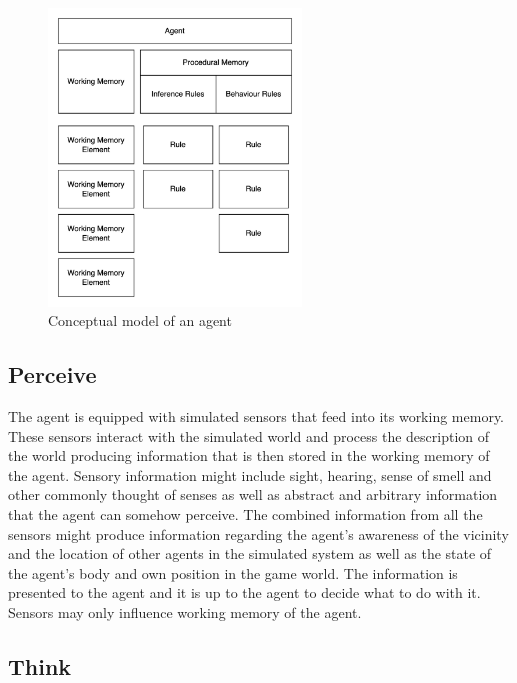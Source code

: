 \begin{figure}[H]
    \centering
    \includegraphics[width=0.6\textwidth]{images/chapter1/agent.drawio.png}
    \caption{Conceptual model of an agent}\label{fig:agent.drawio.png}
\end{figure}

\subsection{Perceive}

The agent is equipped with simulated sensors that feed into its working memory.
These sensors interact with the simulated world and process the description of the world producing information that is then stored in the working memory of the agent.
Sensory information might include sight, hearing, sense of smell and other commonly thought of senses as well as abstract and arbitrary information that the agent can somehow perceive.
The combined information from all the sensors might produce information regarding the agent's awareness of the vicinity and the location of other agents in the simulated system as well as the state of the agent's body and own position in the game world.
The information is presented to the agent and it is up to the agent to decide what to do with it.
Sensors may only influence working memory of the agent.

\subsection{Think}

